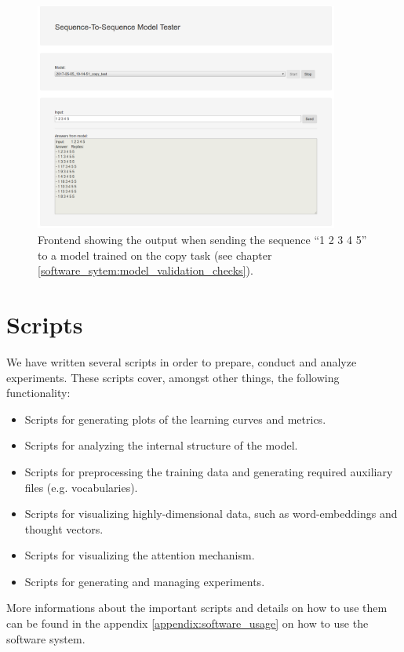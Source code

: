 \begin{figure}[H]
	\centering
	\includegraphics[width=10cm]{img/web_frontend_inference}
	\caption{Frontend showing the output when sending the sequence ``1 2 3 4 5'' to a model trained on the copy task (see chapter \ref{software_sytem:model_validation_checks}).}
\end{figure}

\section{Scripts}
We have written several scripts in order to prepare, conduct and analyze experiments. These scripts cover, amongst other things, the following functionality:

\begin{itemize}[noitemsep]
	\item Scripts for generating plots of the learning curves and metrics.
	\item Scripts for analyzing the internal structure of the model.
	\item Scripts for preprocessing the training data and generating required auxiliary files (e.g. vocabularies).
	\item Scripts for visualizing highly-dimensional data, such as word-embeddings and thought vectors.
	\item Scripts for visualizing the attention mechanism.
	\item Scripts for generating and managing experiments.
\end{itemize}

More informations about the important scripts and details on how to use them can be found in the appendix \ref{appendix:software_usage} on how to use the software system.

